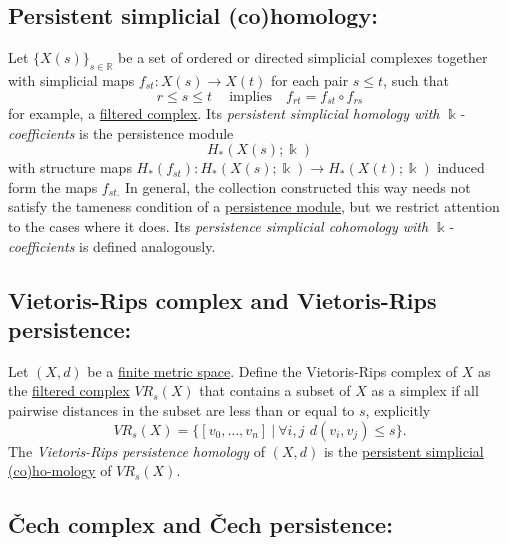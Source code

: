 \documentclass{amsart}
\begin{document}
	\subsection*{Persistent simplicial (co)homology:} \label{persistent simplicial (co)homology}
	
	Let $\{X(s)\}_{s \in \mathbb R} $ be a set of ordered or directed simplicial complexes together with simplicial maps $f_{st} : X(s) \to X(t)$ for each pair $s \leq t$, such that 
	\begin{equation*}
	r \leq s \leq t\ \quad\text{implies} \quad f_{rt} = f_{st} \circ f_{rs}
	\end{equation*}
	for example, a \hyperref[filtered complex]{filtered complex}. Its \textit{persistent simplicial homology with $\Bbbk$-coefficients} is the persistence module
	\begin{equation*}
	H_*(X(s); \Bbbk)
	\end{equation*}
	with structure maps $H_*(f_{st}) : H_*(X(s); \Bbbk) \to H_*(X(t); \Bbbk)$ induced form the maps $f_{st.}$ In general, the collection constructed this way needs not satisfy the tameness condition of a \hyperref[persistence module]{persistence module}, but we restrict attention to the cases where it does. Its \textit{persistence simplicial cohomology with $\Bbbk$-coefficients} is defined analogously.
	
	\subsection*{Vietoris-Rips complex and Vietoris-Rips persistence:} \label{vietoris-rips complex and vietoris-rips persistence}
	
	Let $(X, d)$ be a \hyperref[finite metric spaces and point clouds]{finite metric space}. Define the Vietoris-Rips complex of $X$ as the \hyperref[filtered complex]{filtered complex} $VR_s(X)$ that contains a subset of $X$ as a simplex if all pairwise distances in the subset are less than or equal to $s$, explicitly
	\begin{equation*}
	VR_s(X) = \Big\{ [v_0,\dots,v_n]\ \Big|\ \forall i,j\ \,d(v_i, v_j) \leq s \Big\}.
	\end{equation*}
	The \textit{Vietoris-Rips persistence homology} of $(X, d)$ is the \hyperref[persistent simplicial (co)homology]{persistent simplicial (co)ho-mology} of $VR_s(X)$.
	
	\subsection*{\v{C}ech complex and \v{C}ech persistence:} \label{cech complex and cech persistence}
	
\end{document}
